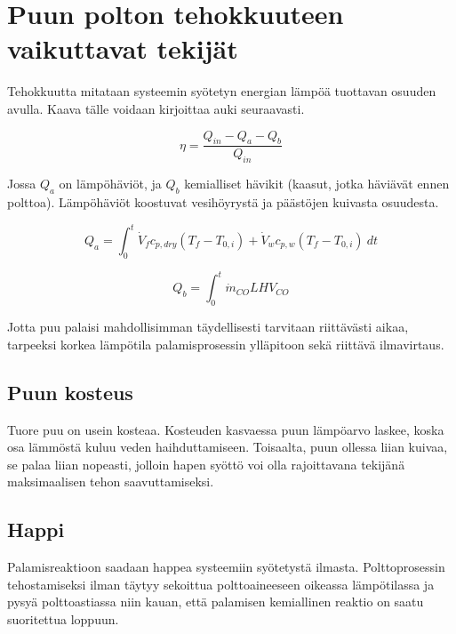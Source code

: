 \section{Puun polton tehokkuuteen vaikuttavat tekijät}

Tehokkuutta mitataan systeemin syötetyn energian lämpöä tuottavan osuuden avulla.
Kaava tälle voidaan kirjoittaa auki seuraavasti.

\begin{equation}
	\eta=\frac{Q_{in}-Q_a-Q_b}{Q_{in}}
\end{equation}

\noindent
Jossa \(Q_a\) on lämpöhäviöt, ja \(Q_b\) kemialliset hävikit (kaasut, jotka häviävät ennen polttoa).
Lämpöhäviöt koostuvat vesihöyrystä ja päästöjen kuivasta osuudesta.

\begin{equation}
	Q_a=\int_0^t{
		\dot V_f c_{p,dry}(T_f-T_{0,i}) +
		\dot V_w c_{p,w}(T_f-T_{0,i})
	}\ dt
\end{equation}

\begin{equation}
	Q_b=\int_0^t{
		\dot m_{CO}LHV_{CO}
	}
\end{equation}

Jotta puu palaisi mahdollisimman täydellisesti tarvitaan riittävästi aikaa,
tarpeeksi korkea lämpötila palamisprosessin ylläpitoon sekä riittävä ilmavirtaus.

\subsection{Puun kosteus}
Tuore puu on usein kosteaa. Kosteuden kasvaessa puun lämpöarvo laskee,
koska osa lämmöstä kuluu veden haihduttamiseen.
Toisaalta, puun ollessa liian kuivaa, se palaa liian nopeasti,
jolloin hapen syöttö voi olla rajoittavana tekijänä maksimaalisen tehon saavuttamiseksi.

\subsection{Happi}

Palamisreaktioon saadaan happea systeemiin syötetystä ilmasta.
Polttoprosessin tehostamiseksi ilman täytyy sekoittua polttoaineeseen oikeassa lämpötilassa
ja pysyä polttoastiassa niin kauan, että palamisen kemiallinen reaktio on saatu
suoritettua loppuun.
